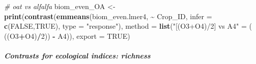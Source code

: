 \documentclass[
]{article}
\newenvironment{Shaded}{\begin{snugshade}}{\end{snugshade}}
\newcommand{\AttributeTok}[1]{\textcolor[rgb]{0.13,0.29,0.53}{#1}}
\newcommand{\CommentTok}[1]{\textcolor[rgb]{0.56,0.35,0.01}{\textit{#1}}}
\newcommand{\ConstantTok}[1]{\textcolor[rgb]{0.56,0.35,0.01}{#1}}
\newcommand{\DecValTok}[1]{\textcolor[rgb]{0.00,0.00,0.81}{#1}}
\newcommand{\FunctionTok}[1]{\textcolor[rgb]{0.13,0.29,0.53}{\textbf{#1}}}
\newcommand{\NormalTok}[1]{#1}
\newcommand{\OtherTok}[1]{\textcolor[rgb]{0.56,0.35,0.01}{#1}}
\newcommand{\SpecialCharTok}[1]{\textcolor[rgb]{0.81,0.36,0.00}{\textbf{#1}}}
\newcommand{\StringTok}[1]{\textcolor[rgb]{0.31,0.60,0.02}{#1}}
\begin{document}
\begin{Shaded}
\begin{Highlighting}[]
\CommentTok{\# oat vs alfalfa}
\NormalTok{biom\_even\_OA }\OtherTok{\textless{}{-}} \FunctionTok{print}\NormalTok{(}\FunctionTok{contrast}\NormalTok{(}\FunctionTok{emmeans}\NormalTok{(biom\_even.lmer4, }\SpecialCharTok{\textasciitilde{}}\NormalTok{ Crop\_ID,}
                                       \AttributeTok{infer =} \FunctionTok{c}\NormalTok{(}\ConstantTok{FALSE}\NormalTok{,}\ConstantTok{TRUE}\NormalTok{), }
                                       \AttributeTok{type =} \StringTok{"response"}\NormalTok{), }
                               \AttributeTok{method =} \FunctionTok{list}\NormalTok{(}\StringTok{"[(O3+O4)/2] vs A4"} \OtherTok{=}\NormalTok{ ( ((O3}\SpecialCharTok{+}\NormalTok{O4)}\SpecialCharTok{/}\DecValTok{2}\NormalTok{)) }\SpecialCharTok{{-}}\NormalTok{ A4)), }
                      \AttributeTok{export =} \ConstantTok{TRUE}\NormalTok{)}
\end{Highlighting}
\end{Shaded}

\subparagraph{Contrasts for ecological indices: richness}\label{contrasts-for-ecological-indices-richness}
\end{document}
